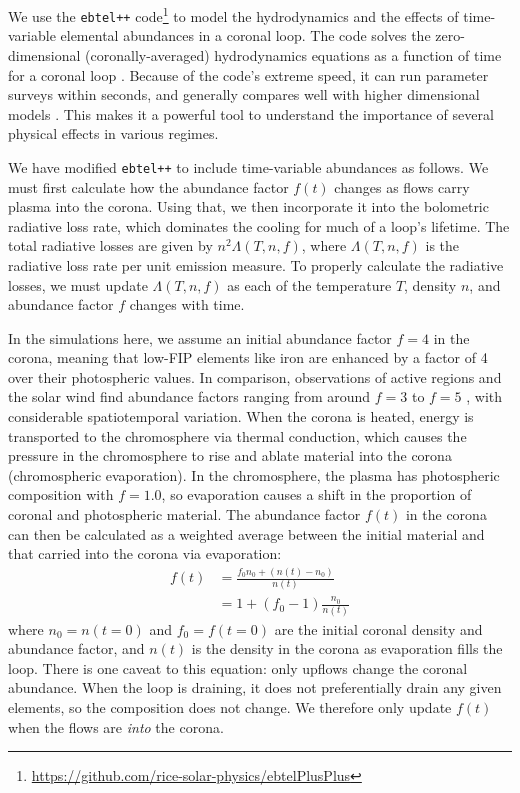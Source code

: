 \documentclass[twocolumn]{aastex631}
\begin{document}
We use the \texttt{ebtel++} code\footnote{\url{https://github.com/rice-solar-physics/ebtelPlusPlus}} \citep{barnes2016} to model the hydrodynamics and the effects of time-variable elemental abundances in a coronal loop.  The code solves the zero-dimensional (coronally-averaged) hydrodynamics equations as a function of time for a coronal loop \citep{klimchuk2008,cargill2012a,cargill2012b}.  Because of the code's extreme speed, it can run parameter surveys within seconds, and generally compares well with higher dimensional models \citep{barnes2016}.  This makes it a powerful tool to understand the importance of several physical effects in various regimes.  

We have modified \texttt{ebtel++} to include time-variable abundances as follows.  We must first calculate how the abundance factor $f(t)$ changes as flows carry plasma into the corona.  Using that, we then incorporate it into the bolometric radiative loss rate, which dominates the cooling for much of a loop's lifetime.  The total radiative losses are given by $n^{2} \Lambda(T, n, f)$, where $\Lambda(T, n, f)$ is the radiative loss rate per unit emission measure.  To properly calculate the radiative losses, we must update $\Lambda(T, n, f)$ as each of the temperature $T$, density $n$, and abundance factor $f$ changes with time.

In the simulations here, we assume an initial abundance factor $f = 4$ in the corona, meaning that low-FIP elements like iron are enhanced by a factor of 4 over their photospheric values.  In comparison, observations of active regions and the solar wind find abundance factors ranging from around $f = 3$ to $f =5$ \citep{brooks2012}, with considerable spatiotemporal variation.  When the corona is heated, energy is transported to the chromosphere via thermal conduction, which causes the pressure in the chromosphere to rise and ablate material into the corona (chromospheric evaporation).  In the chromosphere, the plasma has photospheric composition with $f = 1.0$, so evaporation causes a shift in the proportion of coronal and photospheric material.  The abundance factor $f(t)$ in the corona can then be calculated as a weighted average between the initial material and that carried into the corona via evaporation:
\begin{align}
    f(t) &= \frac{f_{0} n_{0} + (n(t) - n_{0})}{n(t)}  \nonumber \\
     &= 1 + (f_{0} - 1) \frac{n_{0}}{n(t)}
\end{align}
\noindent where $n_{0} = n(t=0)$ and $f_{0} = f(t=0)$ are the initial coronal density and abundance factor, and $n(t)$ is the density in the corona as evaporation fills the loop.  There is one caveat to this equation: only upflows change the coronal abundance.  When the loop is draining, it does not preferentially drain any given elements, so the composition does not change.  We therefore only update $f(t)$ when the flows are \textit{into} the corona.  
\end{document}

